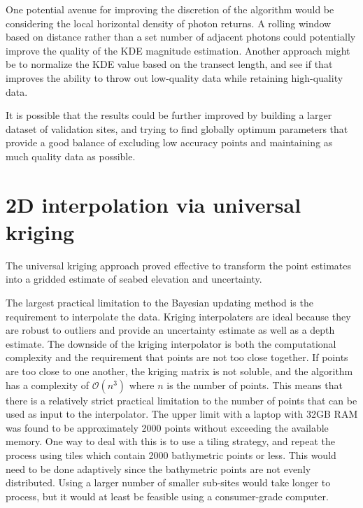 One potential avenue for improving the discretion of the algorithm would be considering the local horizontal density of photon returns. A rolling window based on distance rather than a set number of adjacent photons could potentially improve the quality of the KDE magnitude estimation. Another approach might be to normalize the KDE value based on the transect length, and see if that improves the ability to throw out low-quality data while retaining high-quality data.

It is possible that the results could be further improved by building a larger dataset of validation sites, and trying to find globally optimum parameters that provide a good balance of excluding low accuracy points and maintaining as much quality data as possible.

\section{2D interpolation via universal kriging}

The universal kriging approach proved effective to transform the point estimates into a gridded estimate of seabed elevation and uncertainty. 

The largest practical limitation to the Bayesian updating method is the requirement to interpolate the data. Kriging interpolaters are ideal because they are robust to outliers and provide an uncertainty estimate as well as a depth estimate. The downside of the kriging interpolator is both the computational complexity and the requirement that points are not too close together. If points are too close to one another, the kriging matrix is not soluble, and the algorithm has a complexity of $\mathcal{O}(n^3)$ where $n$ is the number of points. This means that there is a relatively strict practical limitation to the number of points that can be used as input to the interpolator. The upper limit with a laptop with 32GB RAM was found to be approximately 2000 points without exceeding the available memory. One way to deal with this is to use a tiling strategy, and repeat the process using tiles which contain 2000 bathymetric points or less. This would need to be done adaptively since the bathymetric points are not evenly distributed. Using a larger number of smaller sub-sites would take longer to process, but it would at least be feasible using a consumer-grade computer.

